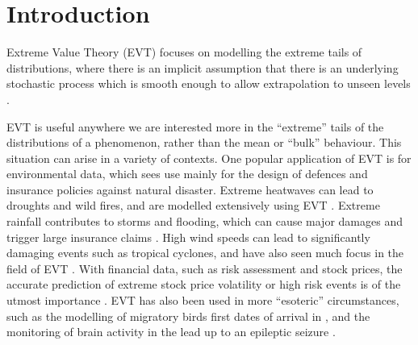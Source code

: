 \documentclass{article}
\numberwithin{equation}{section}
\begin{document}
\section{Introduction}\label{sec:intro}


Extreme Value Theory (EVT) focuses on modelling the extreme tails of distributions, where there is an implicit assumption that there is an underlying stochastic process which is smooth enough to allow extrapolation to unseen levels \citep{Coles2001}.

EVT is useful anywhere we are interested more in the ``extreme'' tails of the distributions of a phenomenon, rather than the mean or ``bulk'' behaviour.
This situation can arise in a variety of contexts.
One popular application of EVT is for environmental data, which sees use mainly for the design of defences and insurance policies against natural disaster.
Extreme heatwaves can lead to droughts and wild fires, and are modelled extensively using EVT \citep{tanarhte2015heat, french2019quantifying, koh2023gradient}.
Extreme rainfall contributes to storms and flooding, which can cause major damages and trigger large insurance claims \citep{Rohrbeck_flooding, osei2021estimation}.
High wind speeds can lead to significantly damaging events such as tropical cyclones, and have also seen much focus in the field of EVT \citep{soukissian2015effect, steinkohl2013extreme}.
With financial data, such as risk assessment and stock prices, the accurate prediction of extreme stock price volatility or high risk events is of the utmost importance \citep{Furio2013, dridi2012monitoring}.
EVT has also been used in more ``esoteric'' circumstances, such as the modelling of migratory birds first dates of arrival in \citet{Koh2024}, and the monitoring of brain activity in the lead up to an epileptic seizure \citet{Karpov2022-xj}.
\end{document}

